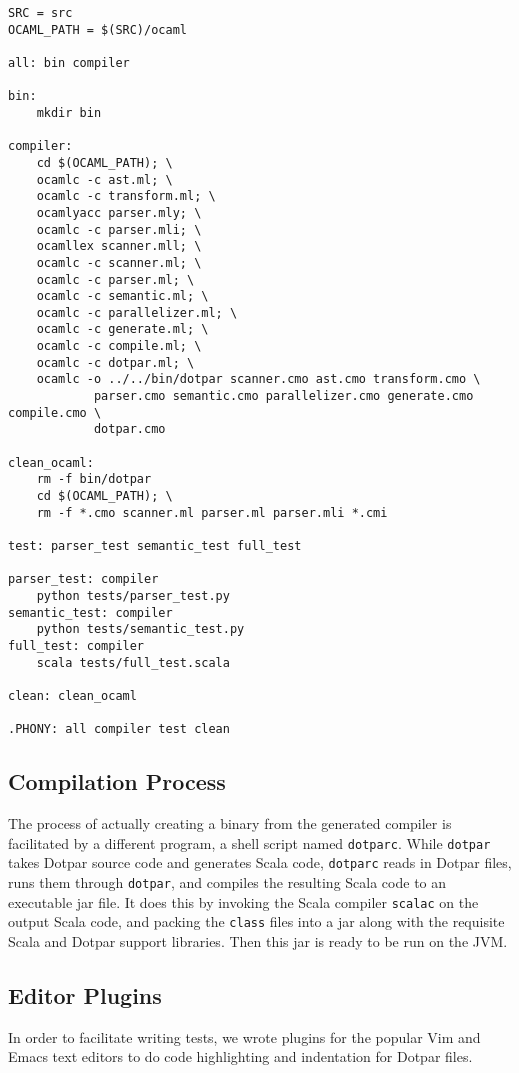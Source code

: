 \begin{verbatim}
SRC = src
OCAML_PATH = $(SRC)/ocaml

all: bin compiler

bin:
	mkdir bin
	
compiler:
	cd $(OCAML_PATH); \
	ocamlc -c ast.ml; \
	ocamlc -c transform.ml; \
	ocamlyacc parser.mly; \
	ocamlc -c parser.mli; \
	ocamllex scanner.mll; \
	ocamlc -c scanner.ml; \
	ocamlc -c parser.ml; \
	ocamlc -c semantic.ml; \
	ocamlc -c parallelizer.ml; \
	ocamlc -c generate.ml; \
	ocamlc -c compile.ml; \
	ocamlc -c dotpar.ml; \
	ocamlc -o ../../bin/dotpar scanner.cmo ast.cmo transform.cmo \
			parser.cmo semantic.cmo parallelizer.cmo generate.cmo compile.cmo \
			dotpar.cmo

clean_ocaml:
	rm -f bin/dotpar
	cd $(OCAML_PATH); \
	rm -f *.cmo scanner.ml parser.ml parser.mli *.cmi

test: parser_test semantic_test full_test

parser_test: compiler
	python tests/parser_test.py
semantic_test: compiler
	python tests/semantic_test.py
full_test: compiler
	scala tests/full_test.scala

clean: clean_ocaml

.PHONY: all compiler test clean
\end{verbatim}

\subsection{Compilation Process}

The process of actually creating a binary from the generated compiler
is facilitated by a different program, a shell script named
\texttt{dotparc}. While \texttt{dotpar} takes Dotpar source code and
generates Scala code, \texttt{dotparc} reads in Dotpar files, runs
them through \texttt{dotpar}, and compiles the resulting Scala code to
an executable jar file. It does this by invoking the Scala compiler
\texttt{scalac} on the output Scala code, and packing the
\texttt{class} files into a jar along with the requisite Scala and
Dotpar support libraries. Then this jar is ready to be run on the JVM.

\subsection{Editor Plugins}

In order to facilitate writing tests, we wrote plugins for the popular
Vim and Emacs text editors to do code highlighting and indentation for
Dotpar files.

